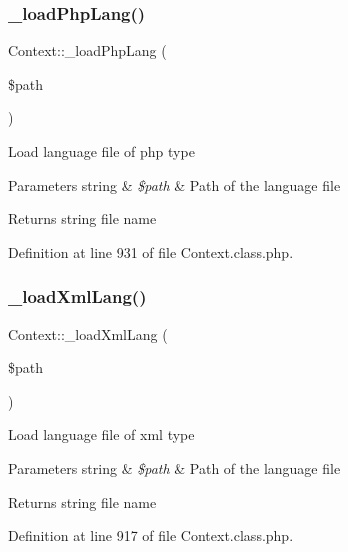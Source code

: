 \subsubsection{\texorpdfstring{\+\_\+load\+Php\+Lang()}{\_loadPhpLang()}}
{\footnotesize\ttfamily Context\+::\+\_\+load\+Php\+Lang (\begin{DoxyParamCaption}\item[{}]{\$path }\end{DoxyParamCaption})}

Load language file of php type


\begin{DoxyParams}[1]{Parameters}
string & {\em \$path} & Path of the language file \\
\hline
\end{DoxyParams}
\begin{DoxyReturn}{Returns}
string file name 
\end{DoxyReturn}


Definition at line 931 of file Context.\+class.\+php.

\hypertarget{classContext_af3ba6aaa8fa5f6c758b7716ec7135ab3}{}\label{classContext_af3ba6aaa8fa5f6c758b7716ec7135ab3} 
\subsubsection{\texorpdfstring{\+\_\+load\+Xml\+Lang()}{\_loadXmlLang()}}
{\footnotesize\ttfamily Context\+::\+\_\+load\+Xml\+Lang (\begin{DoxyParamCaption}\item[{}]{\$path }\end{DoxyParamCaption})}

Load language file of xml type


\begin{DoxyParams}[1]{Parameters}
string & {\em \$path} & Path of the language file \\
\hline
\end{DoxyParams}
\begin{DoxyReturn}{Returns}
string file name 
\end{DoxyReturn}


Definition at line 917 of file Context.\+class.\+php.

\hypertarget{classContext_aae89f13e0d99577a6cb8a3bac584cee1}{}\label{classContext_aae89f13e0d99577a6cb8a3bac584cee1} 
